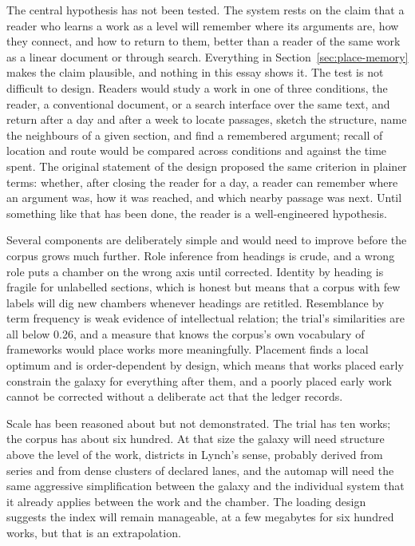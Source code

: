 \documentclass[11pt]{article}
\theoremstyle{remark}
\begin{document}
The central hypothesis has not been tested. The system rests on the claim that a reader who learns a work as a level will remember where its arguments are, how they connect, and how to return to them, better than a reader of the same work as a linear document or through search. Everything in Section~\ref{sec:place-memory} makes the claim plausible, and nothing in this essay shows it. The test is not difficult to design. Readers would study a work in one of three conditions, the reader, a conventional document, or a search interface over the same text, and return after a day and after a week to locate passages, sketch the structure, name the neighbours of a given section, and find a remembered argument; recall of location and route would be compared across conditions and against the time spent. The original statement of the design proposed the same criterion in plainer terms: whether, after closing the reader for a day, a reader can remember where an argument was, how it was reached, and which nearby passage was next. Until something like that has been done, the reader is a well-engineered hypothesis.

Several components are deliberately simple and would need to improve before the corpus grows much further. Role inference from headings is crude, and a wrong role puts a chamber on the wrong axis until corrected. Identity by heading is fragile for unlabelled sections, which is honest but means that a corpus with few labels will dig new chambers whenever headings are retitled. Resemblance by term frequency is weak evidence of intellectual relation; the trial's similarities are all below 0.26, and a measure that knows the corpus's own vocabulary of frameworks would place works more meaningfully. Placement finds a local optimum and is order-dependent by design, which means that works placed early constrain the galaxy for everything after them, and a poorly placed early work cannot be corrected without a deliberate act that the ledger records.

Scale has been reasoned about but not demonstrated. The trial has ten works; the corpus has about six hundred. At that size the galaxy will need structure above the level of the work, districts in Lynch's sense, probably derived from series and from dense clusters of declared lanes, and the automap will need the same aggressive simplification between the galaxy and the individual system that it already applies between the work and the chamber. The loading design suggests the index will remain manageable, at a few megabytes for six hundred works, but that is an extrapolation.
\end{document}
